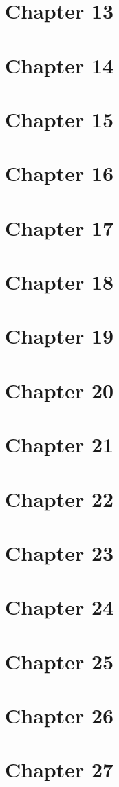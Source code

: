 \documentclass[12pt]{book}
\begin{document}
\chapter{Chapter 13}
\chapter{Chapter 14}
\chapter{Chapter 15}
\chapter{Chapter 16}
\chapter{Chapter 17}
\chapter{Chapter 18}
\chapter{Chapter 19}
\chapter{Chapter 20}
\chapter{Chapter 21}
\chapter{Chapter 22}
\chapter{Chapter 23}
\chapter{Chapter 24}
\chapter{Chapter 25}
\chapter{Chapter 26}
\chapter{Chapter 27}
\end{document}

